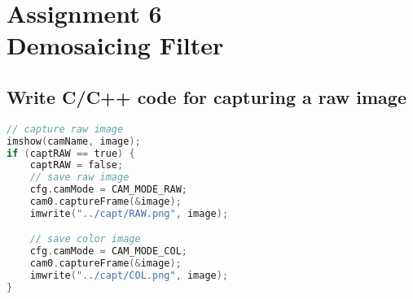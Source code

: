 \section {Assignment 6 \\ {Demosaicing Filter}}
\label {sec:assignment_6}

\subsection{Write C/C++ code for capturing a raw image}

\begin{lstlisting}[language=C, caption=save image to file, label=lst:rawcode]
// capture raw image
imshow(camName, image);
if (captRAW == true) {
    captRAW = false;
    // save raw image
    cfg.camMode = CAM_MODE_RAW;
    cam0.captureFrame(&image);
    imwrite("../capt/RAW.png", image);

    // save color image
    cfg.camMode = CAM_MODE_COL;
    cam0.captureFrame(&image);
    imwrite("../capt/COL.png", image);
}
\end{lstlisting}